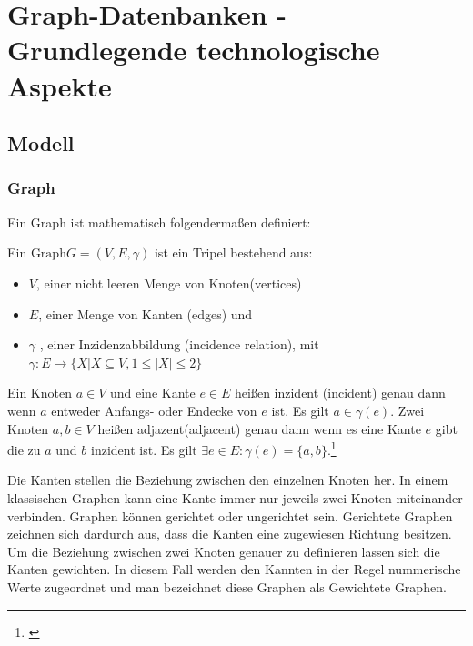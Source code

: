 \chapter{Graph-Datenbanken - Grundlegende technologische Aspekte}
\section{Modell}
\subsection{Graph}
Ein Graph ist mathematisch folgendermaßen definiert:
\begin{definition}
	Ein $\text{Graph} G=(V,E,\gamma)$ ist ein Tripel bestehend aus:
	\begin{itemize}
		\item $V$, einer nicht leeren Menge von Knoten(vertices)
		\item $E$, einer Menge von Kanten (edges) und
		\item $\gamma$ , einer Inzidenzabbildung (incidence relation), mit\\
		$\gamma : E \longrightarrow \{X | X \subseteq V, 1 \leq |X| \leq 2\}$
	\end{itemize}

	Ein Knoten $a \in V$ und eine Kante $e \in E$ heißen inzident (incident)
	genau dann wenn $a$ entweder Anfangs- oder Endecke von $e$ ist. Es gilt $a \in \gamma(e)$.
	Zwei Knoten $a,b \in V$ heißen adjazent(adjacent) genau dann wenn es eine Kante $e$ gibt die zu $a$ und $b$ inzident ist.
	Es gilt	$\exists e \in E: \gamma(e)=\{a,b\}$.\footnote{\cite[Seite 21]{pbeck01}} \\

\end{definition}
Die Kanten stellen die Beziehung zwischen den einzelnen Knoten her.
In einem klassischen Graphen kann eine Kante immer nur jeweils zwei Knoten miteinander verbinden.
Graphen können gerichtet oder ungerichtet sein. Gerichtete Graphen zeichnen sich dardurch aus, dass die Kanten eine zugewiesen Richtung besitzen.
Um die Beziehung zwischen zwei Knoten genauer zu definieren lassen sich die Kanten gewichten.
In diesem Fall werden den Kannten in der Regel nummerische Werte zugeordnet und man bezeichnet diese Graphen als Gewichtete Graphen.

